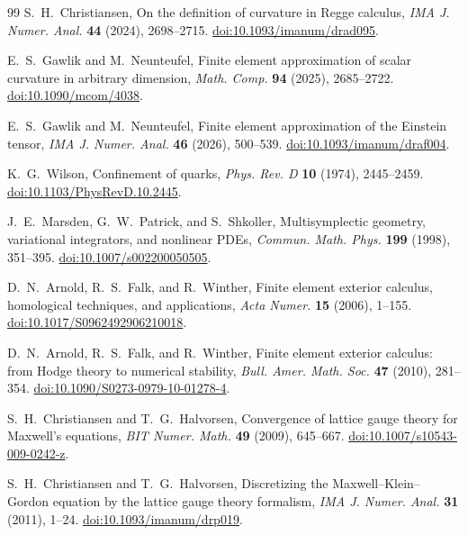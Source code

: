 \documentclass[11pt]{article}
\numberwithin{equation}{section}
\theoremstyle{definition}
\theoremstyle{remark}
\begin{document}
\begin{thebibliography}{99}
S.~H.~Christiansen,
On the definition of curvature in Regge calculus,
\emph{IMA J. Numer. Anal.} \textbf{44} (2024), 2698--2715.
\href{https://doi.org/10.1093/imanum/drad095}{doi:10.1093/imanum/drad095}.

E.~S.~Gawlik and M.~Neunteufel,
Finite element approximation of scalar curvature in arbitrary dimension,
\emph{Math. Comp.} \textbf{94} (2025), 2685--2722.
\href{https://doi.org/10.1090/mcom/4038}{doi:10.1090/mcom/4038}.

E.~S.~Gawlik and M.~Neunteufel,
Finite element approximation of the Einstein tensor,
\emph{IMA J. Numer. Anal.} \textbf{46} (2026), 500--539.
\href{https://doi.org/10.1093/imanum/draf004}{doi:10.1093/imanum/draf004}.

K.~G.~Wilson,
Confinement of quarks,
\emph{Phys. Rev. D} \textbf{10} (1974), 2445--2459.
\href{https://doi.org/10.1103/PhysRevD.10.2445}{doi:10.1103/PhysRevD.10.2445}.

J.~E.~Marsden, G.~W.~Patrick, and S.~Shkoller,
Multisymplectic geometry, variational integrators, and nonlinear PDEs,
\emph{Commun. Math. Phys.} \textbf{199} (1998), 351--395.
\href{https://doi.org/10.1007/s002200050505}{doi:10.1007/s002200050505}.

D.~N.~Arnold, R.~S.~Falk, and R.~Winther,
Finite element exterior calculus, homological techniques, and applications,
\emph{Acta Numer.} \textbf{15} (2006), 1--155.
\href{https://doi.org/10.1017/S0962492906210018}{doi:10.1017/S0962492906210018}.

D.~N.~Arnold, R.~S.~Falk, and R.~Winther,
Finite element exterior calculus: from Hodge theory to numerical stability,
\emph{Bull. Amer. Math. Soc.} \textbf{47} (2010), 281--354.
\href{https://doi.org/10.1090/S0273-0979-10-01278-4}{doi:10.1090/S0273-0979-10-01278-4}.

S.~H.~Christiansen and T.~G.~Halvorsen,
Convergence of lattice gauge theory for Maxwell's equations,
\emph{BIT Numer. Math.} \textbf{49} (2009), 645--667.
\href{https://doi.org/10.1007/s10543-009-0242-z}{doi:10.1007/s10543-009-0242-z}.

S.~H.~Christiansen and T.~G.~Halvorsen,
Discretizing the Maxwell--Klein--Gordon equation by the lattice gauge theory formalism,
\emph{IMA J. Numer. Anal.} \textbf{31} (2011), 1--24.
\href{https://doi.org/10.1093/imanum/drp019}{doi:10.1093/imanum/drp019}.


\end{thebibliography}
\end{document}
